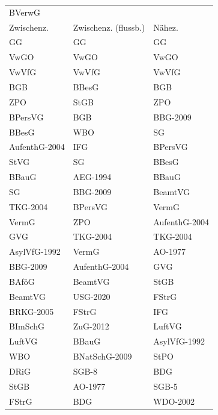 \begin{tabular}{lll}
\toprule
\multicolumn{4}{l}{BVerwG} \\
   Zwischenz. & Zwischenz. (flussb.) &        Nähez. \\
\midrule
           GG &                   GG &            GG \\
         VwGO &                 VwGO &          VwGO \\
        VwVfG &                VwVfG &         VwVfG \\
          BGB &                BBesG &           BGB \\
          ZPO &                 StGB &           ZPO \\
      BPersVG &                  BGB &      BBG-2009 \\
        BBesG &                  WBO &            SG \\
AufenthG-2004 &                  IFG &       BPersVG \\
         StVG &                   SG &         BBesG \\
        BBauG &             AEG-1994 &         BBauG \\
           SG &             BBG-2009 &       BeamtVG \\
     TKG-2004 &              BPersVG &         VermG \\
        VermG &                  ZPO & AufenthG-2004 \\
          GVG &             TKG-2004 &      TKG-2004 \\
 AsylVfG-1992 &                VermG &       AO-1977 \\
     BBG-2009 &        AufenthG-2004 &           GVG \\
        BAföG &              BeamtVG &          StGB \\
      BeamtVG &             USG-2020 &         FStrG \\
    BRKG-2005 &                FStrG &           IFG \\
      BImSchG &             ZuG-2012 &        LuftVG \\
       LuftVG &                BBauG &  AsylVfG-1992 \\
          WBO &        BNatSchG-2009 &          StPO \\
         DRiG &                SGB-8 &           BDG \\
         StGB &              AO-1977 &         SGB-5 \\
        FStrG &                  BDG &      WDO-2002 \\
\bottomrule
\end{tabular}

